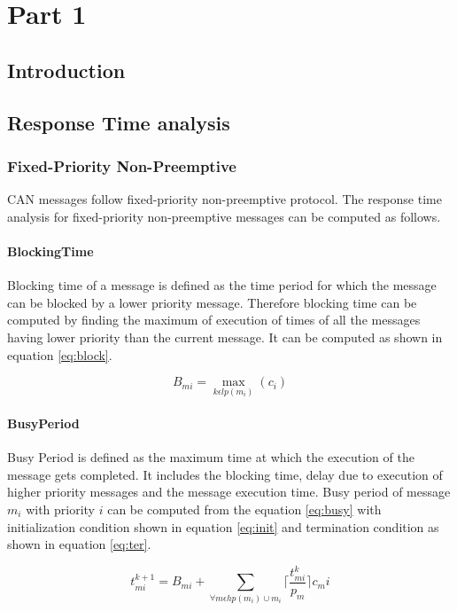 \chapter{Part 1}

\section{Introduction}

\section{Response Time analysis}
\subsection{Fixed-Priority Non-Preemptive}
CAN messages follow fixed-priority non-preemptive protocol. The response time analysis for fixed-priority non-preemptive messages can be computed as follows.

\subsubsection{BlockingTime}
Blocking time of a message is defined as the time period for which the message can be blocked by a lower priority message. Therefore blocking time can be computed by finding the maximum of execution of times of all the messages having lower priority than the current message. It can be computed as shown in equation \ref{eq:block}.

\begin{equation}
B_{mi}=\max_{k\epsilon lp(m_i)}(c_i) 
\label{eq:block}
\end{equation}

\subsubsection{BusyPeriod}
Busy Period is defined as the maximum time at which the execution of the message gets completed. It includes the blocking time, delay due to execution of higher priority messages and the message execution time. Busy period of message $m_i$ with priority $i$ can be computed from the equation \ref{eq:busy} with initialization condition shown in equation \ref{eq:init} and termination condition as shown in equation \ref{eq:ter}. 

\begin{equation}
 t_{mi}^{k+1}=B_{mi}+\sum_{\forall m\epsilon hp(m_i)\cup m_i} \lceil{\frac{t_{mi}^k}{p_m}}\rceil c_mi
\label{eq:init}
\end{equation}


